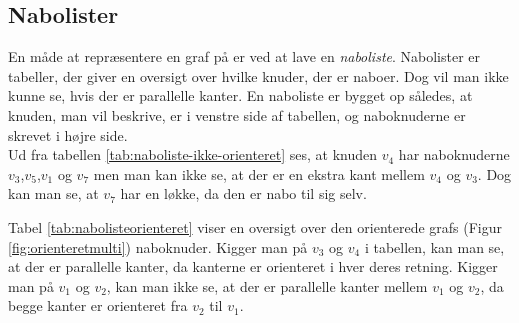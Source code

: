 \subsection{Nabolister}
En måde at repræsentere en graf på er ved at lave en \emph{naboliste}. Nabolister er tabeller, der giver en oversigt over hvilke knuder, der er naboer. Dog vil man ikke kunne se, hvis der er parallelle kanter. En naboliste er bygget op således, at knuden, man vil beskrive, er i venstre side af tabellen, og naboknuderne er skrevet i højre side. \\




Ud fra tabellen \ref{tab:naboliste-ikke-orienteret} ses, at knuden $v_4$ har naboknuderne $v_3$,$v_5$,$v_1$ og $v_7$ men man kan ikke se, at der er en ekstra kant mellem $v_4$ og $v_3$. Dog kan man se, at $v_7$ har en løkke, da den er nabo til sig selv.


Tabel \ref{tab:nabolisteorienteret} viser en oversigt over den orienterede grafs (Figur \ref{fig:orienteretmulti}) naboknuder. Kigger man på $v_3$ og $v_4$ i tabellen, kan man se, at der er parallelle kanter, da kanterne er orienteret i hver deres retning. Kigger man på $v_1$ og $v_2$, kan man ikke se, at der er parallelle kanter mellem $v_1$ og $v_2$, da begge kanter er orienteret fra $v_2$ til $v_1$.